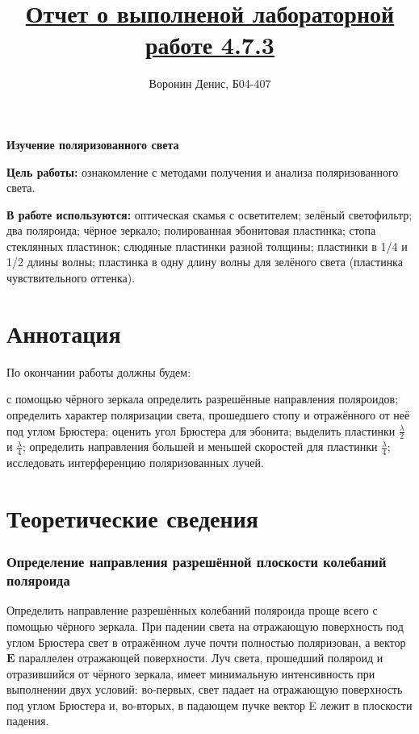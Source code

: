 \documentclass[a4paper]{article}
\title{\underline{Отчет о выполненой лабораторной работе 4.7.3}}
\author{Воронин Денис, Б04-407}
\begin{document}
\maketitle

\begin{center}
\textbf{\Large Изучение поляризованного света}
\end{center}

\textbf{Цель работы:} ознакомление с методами получения и анализа поляризованного света.

\textbf{В работе используются:} оптическая скамья с осветителем; зелёный светофильтр; два поляроида; чёрное зеркало; полированная эбонитовая пластинка; стопа стеклянных пластинок; слюдяные пластинки разной толщины; пластинки в 1/4 и 1/2 длины волны; пластинка
в одну длину волны для зелёного света (пластинка чувствительного оттенка).

\section{Аннотация}

По окончании работы должны будем: \par
с помощью чёрного зеркала определить разрешённые направления поляроидов; определить характер поляризации
света, прошедшего стопу и отражённого от неё под углом Брюстера;
оценить угол Брюстера для эбонита; выделить пластинки $\frac{\lambda }{2}$ и $\frac{\lambda }{4}$;
определить направления большей и меньшей скоростей для пластинки
$\frac{\lambda }{4}$; исследовать интерференцию поляризованных лучей.

\section{Теоретические сведения}

\subsubsection{Определение направления разрешённой плоскости колебаний поляроида}
	
Определить направление разрешённых колебаний поляроида проще всего с помощью чёрного зеркала. При падении света на отражающую поверхность под углом Брюстера свет в отражённом луче почти полностью поляризован, а вектор $\mathbf{E}$ параллелен отражающей поверхности. Луч света, прошедший поляроид и отразившийся от чёрного зеркала, имеет минимальную интенсивность при выполнении двух условий: во-первых, свет падает на отражающую поверхность под углом Брюстера и, во-вторых,
в падающем пучке вектор E лежит в плоскости падения.
\end{document}
